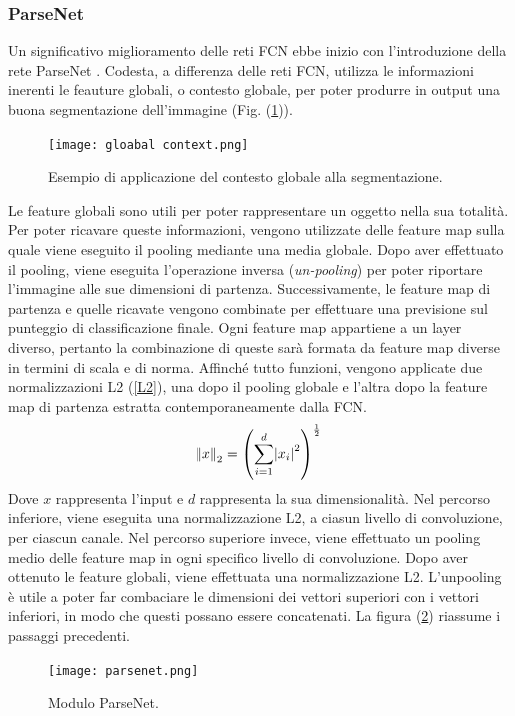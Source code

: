 \subsubsection{ParseNet}
Un significativo miglioramento delle reti FCN ebbe inizio con l'introduzione della 
rete ParseNet \cite{parsenet}. Codesta, a differenza delle reti FCN, utilizza le informazioni 
inerenti le feauture globali, o contesto globale, per poter produrre in output una 
buona segmentazione dell'immagine (Fig. (\ref{global context})).
\begin{figure}
    \centering
    \texttt{[image: gloabal context.png]}
    \centering
    \caption{Esempio di applicazione del contesto globale alla segmentazione.}
    \label{global context}
\end{figure}
Le feature globali sono utili per poter rappresentare un oggetto nella sua 
totalità. Per poter ricavare queste informazioni, vengono utilizzate delle feature 
map sulla quale viene eseguito il pooling mediante una media globale. Dopo aver 
effettuato il pooling, viene eseguita l'operazione inversa (\emph{un-pooling}) per poter 
riportare l'immagine alle sue dimensioni di partenza. Successivamente, le feature 
map di partenza e quelle ricavate vengono combinate per effettuare una previsione 
sul punteggio di classificazione finale. Ogni feature map appartiene a un layer 
diverso, pertanto la combinazione di queste sarà formata da feature map diverse 
in termini di scala e di norma. Affinché tutto funzioni, vengono applicate due 
normalizzazioni L2 (\ref{L2}), una dopo il pooling globale e l'altra dopo la feature 
map di partenza estratta contemporaneamente dalla FCN. 
\begin{equation}\label{L2}
    \norm{x}_2 = \left(\sum_{i=1}^d \abs{x_i}^2 \right)^\frac{1}{2}
\end{equation}
Dove $x$ rappresenta l'input e $d$ rappresenta la sua dimensionalità. Nel percorso 
inferiore, viene eseguita una normalizzazione L2, a ciasun livello di convoluzione, 
per ciascun canale. Nel percorso superiore invece, viene effettuato un pooling 
medio delle feature map in ogni specifico livello di convoluzione. Dopo aver 
ottenuto le feature globali, viene effettuata una normalizzazione L2. L'unpooling 
è utile a poter far combaciare le dimensioni dei vettori superiori con i vettori 
inferiori, in modo che questi possano essere concatenati. La figura (\ref{parsenet}) riassume 
i passaggi precedenti.
\begin{figure}
    \centering
    \texttt{[image: parsenet.png]}
    \centering
    \caption{Modulo ParseNet.}
    \label{parsenet}
\end{figure}

